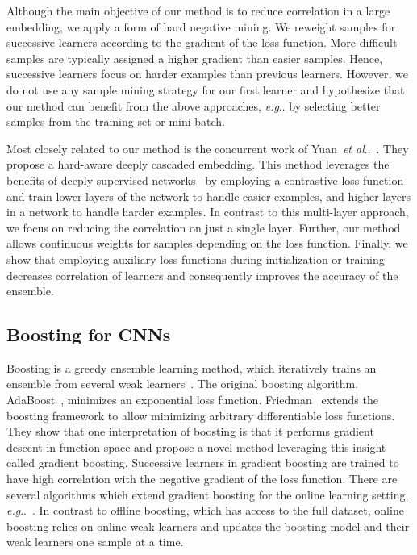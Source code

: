 \documentclass[10pt,journal,compsoc]{IEEEtran}
\makeatletter
\DeclareRobustCommand\onedot{\futurelet\@let@token\@onedot}
\def\@onedot{\ifx\@let@token.\else.\null\fi\xspace}
\def\eg{\emph{e.g}\onedot} \def\Eg{\emph{E.g}\onedot}
\def\etal{\emph{et al}\onedot}
\makeatother
\begin{document}
Although the main objective of our method is to reduce correlation in a large
embedding, we apply a form of hard negative mining. We reweight samples for
successive learners according to the gradient of the loss function. More
difficult samples are typically assigned a higher gradient than easier samples.
Hence, successive learners focus on harder examples than previous learners. 
However, we do not use any sample mining strategy for our first learner and hypothesize that our 
method can benefit from the above approaches, \eg by selecting 
better samples from the training-set or mini-batch.

Most closely related to our method is the concurrent work of Yuan~\etal~\cite{yuan2016hard}. 
They propose a hard-aware deeply cascaded embedding.
This method leverages the benefits of deeply supervised
networks~\cite{lee2015deeply,Szegedy2014} by employing a contrastive loss
function and train lower layers of the network to handle easier examples, and
higher layers in a network to handle harder examples. In contrast to this
multi-layer approach, we focus on reducing the correlation on just a single
layer.  
Further, our method
allows continuous weights for samples depending on the loss function.
Finally, we show that 
employing auxiliary loss functions during initialization or training decreases correlation of learners
and consequently improves the accuracy of the ensemble.

\subsection{Boosting for CNNs}\label{sec:related-work-cnn-boosting}

Boosting is a greedy ensemble learning method, which iteratively trains an
ensemble from several weak learners~\cite{freund1997boost}. The original boosting algorithm, AdaBoost~\cite{freund1997boost}, minimizes an exponential loss function.  
Friedman~\cite{friedman2001} extends the boosting framework to allow minimizing arbitrary differentiable loss functions. 
They show that one interpretation of boosting is that it
performs gradient descent in function space and propose a novel method leveraging this insight called
gradient boosting. 
Successive learners in gradient boosting
are trained to have high correlation with the negative gradient of
the loss function. There are several algorithms which extend gradient boosting
for the online learning setting, \eg~\cite{beygelzimer2015online,
beygelzimer2015optimal,  chen2012online, leistner2009robustness}. In contrast
to offline boosting, which has access to the full dataset, online boosting
relies on online weak learners and updates the boosting model and their weak
learners one sample at a time. 
\end{document}
